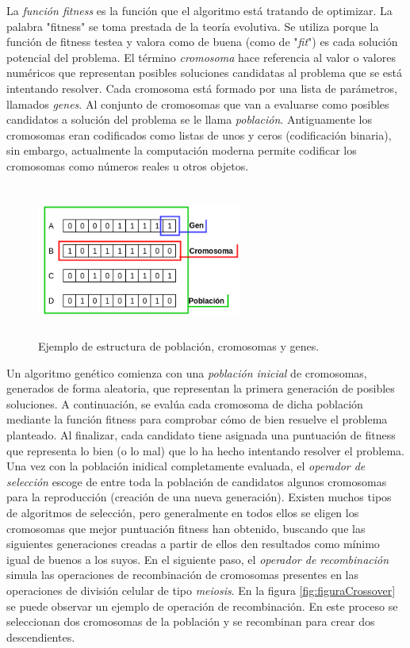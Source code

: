 La \textit{función fitness} es la función que el algoritmo está tratando de optimizar. La palabra "fitness" se toma prestada de la teoría evolutiva.
Se utiliza porque la función de fitness testea y valora como de buena (como de "\textit{fit}") es cada solución potencial del problema. El término
\textit{cromosoma} hace referencia al valor o valores numéricos que representan posibles soluciones candidatas al problema que se está intentando resolver.
Cada cromosoma está formado por una lista de parámetros, llamados \textit{genes}. Al conjunto de cromosomas que van a evaluarse como posibles candidatos a solución
del problema se le llama \textit{población}. Antiguamente los cromosomas eran codificados como listas de unos y ceros (codificación binaria), sin embargo, actualmente la computación
moderna permite codificar los cromosomas como números reales u otros objetos.

\begin{figure}[H]
    \centering
    \includegraphics[width=0.6\textwidth,height=5cm]{Imagenes/PoblacionGA}
    \caption{Ejemplo de estructura de población, cromosomas y genes.}
    \label{fig:figuraPoblacionGA}
\end{figure}

Un algoritmo genético comienza con una \textit{población inicial} de cromosomas, generados de forma aleatoria, que representan la primera generación de posibles soluciones. A continuación,
se evalúa cada cromosoma de dicha población mediante la función fitness para comprobar cómo de bien resuelve el problema planteado. Al finalizar, cada candidato tiene asignada una puntuación
de fitness que representa lo bien (o lo mal) que lo ha hecho intentando resolver el problema.
Una vez con la población inidical completamente evaluada, el \textit{operador de selección} escoge de entre toda la población de candidatos algunos cromosomas para la reproducción (creación
de una nueva generación). Existen muchos tipos de algoritmos de selección, pero generalmente en todos ellos se eligen los cromosomas que mejor puntuación fitness han obtenido, buscando que
las siguientes generaciones creadas a partir de ellos den resultados como mínimo igual de buenos a los suyos.
En el siguiente paso, el \textit{operador de recombinación} simula las operaciones de recombinación de cromosomas presentes en las operaciones de división celular de tipo \textit{meiosis}. En la figura
\ref{fig:figuraCrossover} se puede observar un ejemplo de operación de recombinación. En este proceso se seleccionan dos cromosomas de la población y se recombinan para crear dos descendientes.

